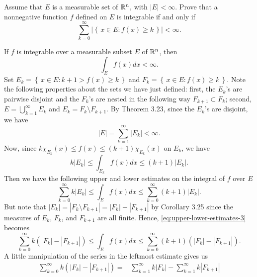\begin{problem}
Assume that $E$ is a measurable set of $\mathbb{R}^n$, with
$|E|<\infty$. Prove that a nonnegative function $f$ defined
on $E$ is integrable if and only if
\[
\sum_{k=0}^\infty\left|\left\{\, x \in E:f( x )\geq
    k\,\right\}\right|<\infty.
\]
\end{problem}
\begin{solution}
If $f$ is integrable over a measurable subset $E$ of $\mathbb{R}^n$, then
\begin{equation}
\label{eq:integrability-3}
\int_E f( x ) d  x <\infty.
\end{equation}
Set $E_k=\left\{\, x \in E:k+1>f( x )\geq k\,\right\}$ and
$F_k=\left\{\, x \in E:f( x )\geq k\,\right\}$. Note the
following properties about the sets we have just defined: first, the
$E_k$'s are pairwise disjoint and the $F_k$'s are nested in the following
way $F_{k+1}\subset F_k$; second, $E=\bigcup_{k=1}^\infty E_k$ and
$E_k=F_k\setminus F_{k+1}$. By Theorem 3.23, since the $E_k$'s are disjoint,
we have
\begin{equation}
  \label{eq:disjoint-measurable-sets-3}
|E|=\sum_{k=1}^\infty|E_k|<\infty.
\end{equation}
Now, since $k\chi_{E_k}( x )\leq f( x )\leq (k+1)\chi_{E_k}( x )$ on
$E_k$, we have
\begin{equation}
\label{eq:estimates-E-k-3}
k|E_k|\leq\int_{E_k}f( x ) d  x \leq (k+1)|E_k|.
\end{equation}
Then we have the following upper and lower estimates on the integral of $f$
over $E$
\begin{equation}
\label{eq:upper-lower-estimates-3}
\sum_{k=0}^\infty k|E_k|\leq\int_E f( x ) d  x \leq\sum_{k=0}^\infty(k+1)|E_k|.
\end{equation}
But note that $|E_k|=|F_k\setminus F_{k+1}|=|F_k|-|F_{k+1}|$ by Corollary 3.25
since the measures of $E_k$, $F_k$, and $F_{k+1}$ are all finite. Hence,
\eqref{eq:upper-lower-estimates-3} becomes
\begin{equation}
\label{eq:new-upper-lower-estimates-3}
\sum_{k=0}^\infty k\left(|F_k|-|F_{k+1}|\right)\leq
\int_E f( x ) d  x \leq
\sum_{k=0}^\infty (k+1)\left(|F_k|-|F_{k+1}|\right).
\end{equation}
A little manipulation of the series in the leftmost estimate gives us
\begin{equation}
\label{eq:leftmost-estimate-3}
\begin{aligned}
\sum_{k=0}^\infty k\left(|F_k|-|F_{k+1}|\right)
={}&\sum_{k=1}^\infty k|F_k|-\sum_{k=1}^\infty k|F_{k+1}|\\

\end{aligned}
\end{equation}
\end{solution}
